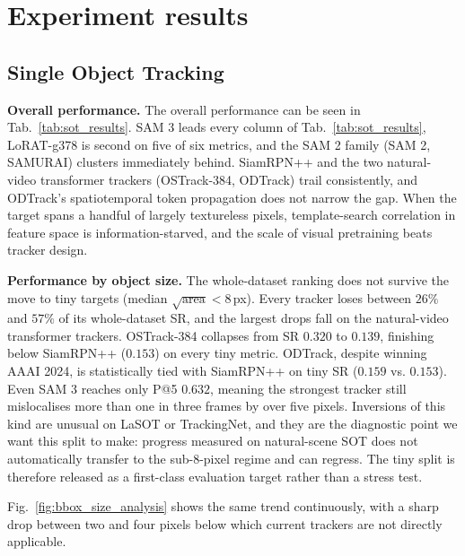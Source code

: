 \documentclass{article}
\newcommand{\subhead}[1]{\noindent\textbf{#1.}}
\begin{document}
\section{Experiment results}

\subsection{Single Object Tracking}

\subhead{Overall performance}
\label{sec:exp_sot_overall}
The overall performance can be seen in Tab.~\ref{tab:sot_results}. SAM 3
leads every column of Tab.~\ref{tab:sot_results}, LoRAT-g378 is
second on five of six metrics, and the SAM 2 family (SAM 2, SAMURAI)
clusters immediately behind. SiamRPN++ and the two natural-video
transformer trackers (OSTrack-384, ODTrack) trail consistently, and
ODTrack's spatiotemporal token propagation does not narrow the gap.
When the target spans a handful of largely textureless pixels,
template-search correlation in feature space is information-starved,
and the scale of visual pretraining beats tracker design.



\subhead{Performance by object size}
\label{sec:exp_sot_size}
The whole-dataset ranking does not survive the move to tiny targets
(median $\sqrt{\mathrm{area}} < 8$\,px). Every tracker loses between
$26\%$ and $57\%$ of its whole-dataset SR, and the largest drops
fall on the natural-video transformer trackers. OSTrack-384
collapses from SR $0.320$ to $0.139$, finishing below SiamRPN++
($0.153$) on every tiny metric. ODTrack, despite winning AAAI 2024,
is statistically tied with SiamRPN++ on tiny SR ($0.159$ vs.
$0.153$). Even SAM 3 reaches only P@5 $0.632$, meaning the strongest
tracker still mislocalises more than one in three frames by over
five pixels. Inversions of this kind are unusual on LaSOT or
TrackingNet, and they are the diagnostic point we want this split
to make: progress measured on natural-scene SOT does not
automatically transfer to the sub-8-pixel regime and can regress.
The tiny split is therefore released as a first-class evaluation
target rather than a stress test.

Fig.~\ref{fig:bbox_size_analysis} shows the same trend
continuously, with a sharp drop between two and four pixels below
which current trackers are not directly applicable.
\end{document}
